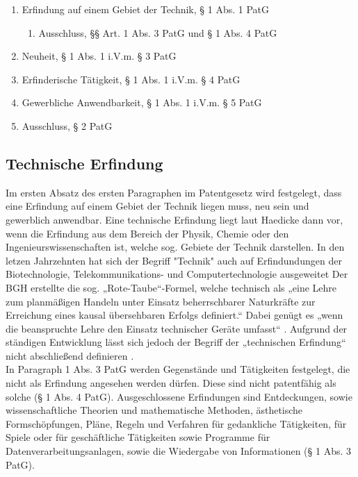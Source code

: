 \begin{enumerate}
    \item Erfindung auf einem Gebiet der Technik, § 1 Abs. 1 PatG
    \begin{enumerate}
    \vspace{-0.05in}
    \item Ausschluss, §§ Art. 1 Abs. 3 PatG und § 1 Abs. 4 PatG
    \end{enumerate}
    \vspace{-0.11in} 
    \item Neuheit, § 1 Abs. 1 i.V.m. § 3 PatG
    \vspace{-0.11in} 
    \item Erfinderische Tätigkeit, § 1 Abs. 1 i.V.m. § 4 PatG
    \vspace{-0.11in} 
    \item Gewerbliche Anwendbarkeit, § 1 Abs. 1 i.V.m. § 5 PatG
    \vspace{-0.11in} 
    \item Ausschluss, § 2 PatG
\end{enumerate}

\subsection{Technische Erfindung \label{sec:tecer}}

Im ersten Absatz des ersten Paragraphen im Patentgesetz wird festgelegt,
dass eine Erfindung auf einem Gebiet der Technik liegen muss, neu sein und
gewerblich anwendbar.
Eine technische Erfindung liegt laut Haedicke dann vor, 
wenn die Erfindung aus dem Bereich der Physik, 
Chemie oder den Ingenieurswissenschaften ist, 
welche sog. Gebiete der Technik darstellen.
In den letzen Jahrzehnten hat sich der Begriff 
"Technik" auch auf Erfindundungen der Biotechnologie, 
Telekommunikations- und Computertechnologie ausgeweitet 
\cite{haedickeEinfuhrung2020}
Der \gls{BGH} erstellte die
sog. „Rote-Taube“-Formel, welche technisch als  
„eine Lehre zum planmäßigen Handeln 
unter Einsatz beherrschbarer Naturkräfte zur Erreichung eines 
kausal übersehbaren Erfolgs definiert.“\cite{BGH27031969}  
Dabei genügt es „wenn die beanspruchte Lehre den Einsatz technischer Geräte umfasst“
\cite{BGH3020152015}\cite{BGH2420112011}. 
Aufgrund der ständigen Entwicklung lässt sich 
jedoch der Begriff der „technischen Erfindung“ 
nicht abschließend definieren \cite{haedickeEinfuhrung2020}.
\\
In Paragraph 1 Abs. 3 PatG werden Gegenstände und Tätigkeiten festgelegt, 
die nicht als Erfindung angesehen werden dürfen. 
Diese sind nicht patentfähig als solche (§ 1 Abs. 4 PatG). 
Ausgeschlossene Erfindungen sind Entdeckungen, 
sowie wissenschaftliche Theorien und mathematische Methoden, 
ästhetische Formschöpfungen, Pläne, Regeln und Verfahren für gedankliche Tätigkeiten, 
für Spiele 
oder für geschäftliche Tätigkeiten sowie Programme für Datenverarbeitungsanlagen, 
sowie die Wiedergabe von Informationen (§ 1 Abs. 3 PatG). 
\\

